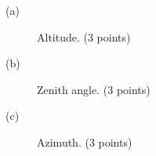 \begin{description}
\item[(a)] Altitude. \hfill(3 points)
\item[(b)] Zenith angle. \hfill(3 points)
\item[(c)] Azimuth. \hfill(3 points)
\end{description}
